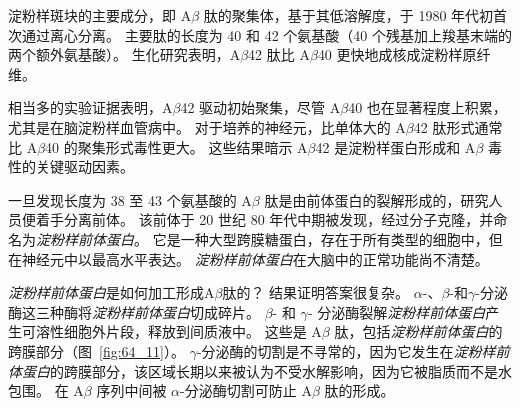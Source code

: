 淀粉样斑块的主要成分，即 A$\beta$ 肽的聚集体，基于其低溶解度，于 1980 年代初首次通过离心分离。
主要肽的长度为 40 和 42 个氨基酸（40 个残基加上羧基末端的两个额外氨基酸）。
生化研究表明，A$\beta$42 肽比 A$\beta$40 更快地成核成淀粉样原纤维。


相当多的实验证据表明，A$\beta$42 驱动初始聚集，尽管 A$\beta$40 也在显著程度上积累，尤其是在脑淀粉样血管病中。
对于培养的神经元，比单体大的 A$\beta$42 肽形式通常比 A$\beta$40 的聚集形式毒性更大。
这些结果暗示 A$\beta$42 是淀粉样蛋白形成和 A$\beta$ 毒性的关键驱动因素。


一旦发现长度为 38 至 43 个氨基酸的 A$\beta$ 肽是由前体蛋白的裂解形成的，研究人员便着手分离前体。
该前体于 20 世纪 80 年代中期被发现，经过分子克隆，并命名为\textit{淀粉样前体蛋白}。
它是一种大型跨膜糖蛋白，存在于所有类型的细胞中，但在神经元中以最高水平表达。
\textit{淀粉样前体蛋白}在大脑中的正常功能尚不清楚。


\textit{淀粉样前体蛋白}是如何加工形成A$\beta$肽的？
结果证明答案很复杂。
$\alpha$-、$\beta$-和$\gamma$-分泌酶这三种酶将\textit{淀粉样前体蛋白}切成碎片。
$\beta$- 和 $\gamma$- 分泌酶裂解\textit{淀粉样前体蛋白}产生可溶性细胞外片段，释放到间质液中。
这些是 A$\beta$ 肽，包括\textit{淀粉样前体蛋白}的跨膜部分（图~\ref{fig:64_11}）。
$\gamma$-分泌酶的切割是不寻常的，因为它发生在\textit{淀粉样前体蛋白}的跨膜部分，该区域长期以来被认为不受水解影响，因为它被脂质而不是水包围。
在 A$\beta$ 序列中间被 $\alpha$-分泌酶切割可防止 A$\beta$ 肽的形成。


